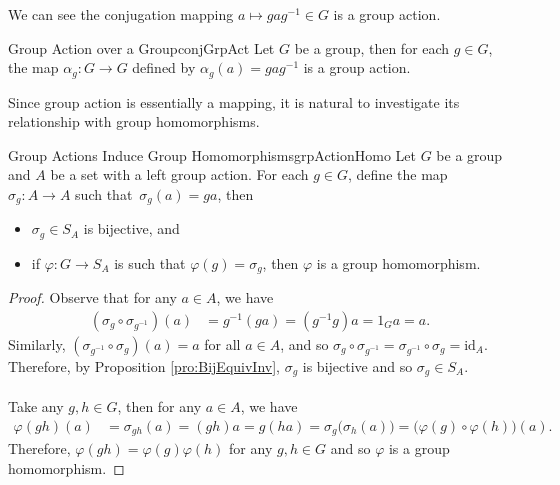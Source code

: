 \documentclass[math]{amznotes}
\theoremstyle{remark}
\newcommand{\0}{\mathbf{0}}
\newcommand{\1}{\mathbf{1}}
\begin{document}
We can see the conjugation mapping $a \mapsto gag^{-1} \in G$ is a group action.
\begin{probox}{Group Action over a Group}{conjGrpAct}
    Let $G$ be a group, then for each $g \in G$, the map $\alpha_g \colon G \to G$ defined by $\alpha_g\left(a\right) = gag^{-1}$ is a group action.
\end{probox}
Since group action is essentially a mapping, it is natural to investigate its relationship with group homomorphisms.
\begin{probox}{Group Actions Induce Group Homomorphisms}{grpActionHomo}
    Let $G$ be a group and $A$ be a set with a left group action. For each $g \in G$, define the map~$\sigma_g \colon A \to A$ such that~$\sigma_g\left(a\right) = ga$, then 
    \begin{itemize}
        \item $\sigma_g \in S_A$ is bijective, and 
        \item if $\varphi \colon G \to S_A$ is such that $\varphi\left(g\right) = \sigma_g$, then $\varphi$ is a group homomorphism.
    \end{itemize}
    \tcblower
    \begin{proof}
        Observe that for any $a \in A$, we have 
        \begin{align*}
            \left(\sigma_g \circ \sigma_{g^{-1}}\right)\left(a\right) & = g^{-1}\left(ga\right) = \left(g^{-1}g\right)a = 1_Ga = a.
        \end{align*}
        Similarly, $\left(\sigma_{g^{-1}} \circ \sigma_{g}\right)\left(a\right) = a$ for all $a \in A$, and so $\sigma_g \circ \sigma_{g^{-1}} = \sigma_{g^{-1}} \circ \sigma_{g} = \mathrm{id}_A$. Therefore, by Proposition \ref{pro:BijEquivInv}, $\sigma_g$ is bijective and so $\sigma_g \in S_A$.
        \\\\
        Take any $g, h \in G$, then for any $a \in A$, we have 
        \begin{align*}
            \varphi\left(gh\right)\left(a\right) & = \sigma_{gh}\left(a\right) = \left(gh\right)a = g\left(ha\right) = \sigma_g\bigl(\sigma_h\left(a\right)\bigr) = \bigl(\varphi\left(g\right) \circ \varphi\left(h\right)\bigr)\left(a\right).
        \end{align*}
        Therefore, $\varphi\left(gh\right) = \varphi\left(g\right)\varphi\left(h\right)$ for any $g, h \in G$ and so $\varphi$ is a group homomorphism.
    \end{proof}
\end{probox}
\end{document}
